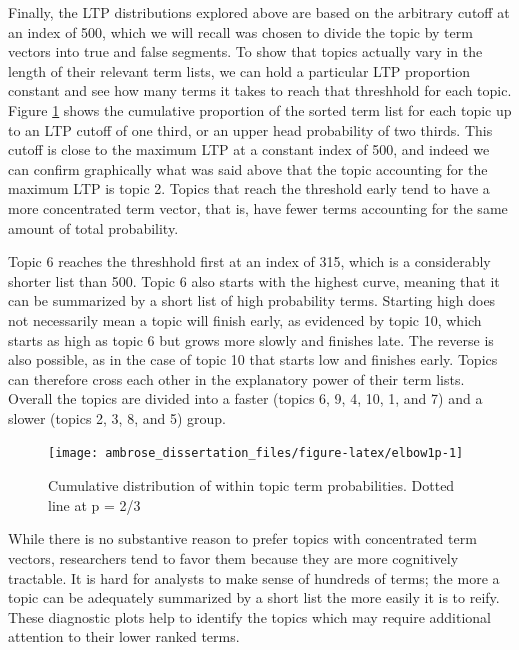 \documentclass[]{book}
\theoremstyle{definition}
\theoremstyle{definition}
\theoremstyle{definition}
\theoremstyle{remark}
\begin{document}
Finally, the LTP distributions explored above are based on the arbitrary
cutoff at an index of 500, which we will recall was chosen to divide the
topic by term vectors into true and false segments. To show that topics
actually vary in the length of their relevant term lists, we can hold a
particular LTP proportion constant and see how many terms it takes to
reach that threshhold for each topic. Figure \ref{fig:elbow1p} shows the
cumulative proportion of the sorted term list for each topic up to an
LTP cutoff of one third, or an upper head probability of two thirds.
This cutoff is close to the maximum LTP at a constant index of 500, and
indeed we can confirm graphically what was said above that the topic
accounting for the maximum LTP is topic 2. Topics that reach the
threshold early tend to have a more concentrated term vector, that is,
have fewer terms accounting for the same amount of total probability.

Topic 6 reaches the threshhold first at an index of 315, which is a
considerably shorter list than 500. Topic 6 also starts with the highest
curve, meaning that it can be summarized by a short list of high
probability terms. Starting high does not necessarily mean a topic will
finish early, as evidenced by topic 10, which starts as high as topic 6
but grows more slowly and finishes late. The reverse is also possible,
as in the case of topic 10 that starts low and finishes early. Topics
can therefore cross each other in the explanatory power of their term
lists. Overall the topics are divided into a faster (topics 6, 9, 4, 10,
1, and 7) and a slower (topics 2, 3, 8, and 5) group.

\begin{figure}

{\centering \texttt{[image: ambrose\_dissertation\_files/figure-latex/elbow1p-1]} 

}

\caption{Cumulative distribution of within topic term probabilities. Dotted line at p = 2/3}\label{fig:elbow1p}
\end{figure}

While there is no substantive reason to prefer topics with concentrated
term vectors, researchers tend to favor them because they are more
cognitively tractable. It is hard for analysts to make sense of hundreds
of terms; the more a topic can be adequately summarized by a short list
the more easily it is to reify. These diagnostic plots help to identify
the topics which may require additional attention to their lower ranked
terms.
\end{document}
